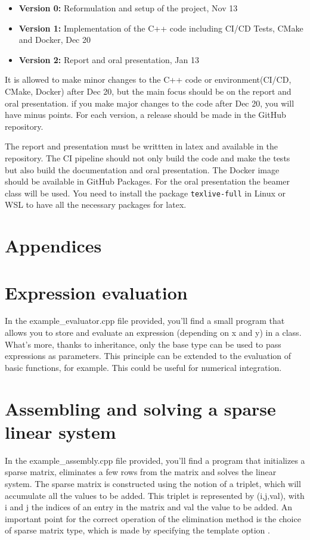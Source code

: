 \documentclass[english,10pt,a4paper]{article}
\begin{document}
\begin{itemize}
    \item \textbf{Version 0:} Reformulation and setup of the project, Nov 13
    \item \textbf{Version 1:} Implementation of the C++ code including CI/CD Tests, CMake and Docker, Dec 20
    \item \textbf{Version 2:} Report and oral presentation, Jan 13
\end{itemize}

It is allowed to make minor changes to the C++ code or environment(CI/CD, CMake, Docker) after Dec 20, but the main focus should be on the report and oral presentation.
if you make major changes to the code after Dec 20, you will have minus points.
For each version, a release should be made in the GitHub repository.

The report and presentation must be writtten in latex and available in the repository. 
The CI pipeline should not only build the code and make the tests but also build the documentation and oral presentation. 
The Docker image should be available in GitHub Packages.
For the oral presentation the beamer class will be used.
You need to install the package \texttt{texlive-full} in Linux or WSL to have all the necessary packages for latex.

\section*{Appendices}

\section*{Expression evaluation}
In the example\_evaluator.cpp file provided, you'll find a small program that allows you to store and evaluate an expression (depending on x and y) in a class.
What's more, thanks to inheritance, only the base type can be used to pass expressions as parameters.
This principle can be extended to the evaluation of basic functions, for example.
This could be useful for numerical integration.

\section*{Assembling and solving a sparse linear system}

In the example\_assembly.cpp file provided, you'll find a program that initializes a sparse matrix, eliminates a few rows from the matrix and solves the linear system.
The sparse matrix is constructed using the notion of a triplet, which will accumulate all the values to be added.
This triplet is represented by (i,j,val), with i and j the indices of an entry in the matrix and val the value to be added.
An important point for the correct operation of the elimination method is the choice of sparse matrix type, which is made by specifying the template option .
\end{document}
